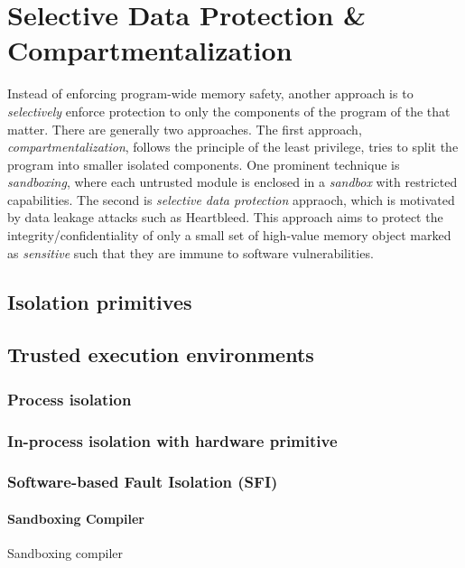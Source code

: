 \documentclass[11pt]{memoir}
\begin{document}
\section{Selective Data Protection \& Compartmentalization}
Instead of enforcing program-wide memory safety, another approach is to \emph{selectively} enforce protection to only the components of the program of the that matter.
There are generally two approaches.
The first approach, \emph{compartmentalization}, follows the principle of the least privilege, tries to split the program into smaller isolated components.
One prominent technique is \emph{sandboxing}, where each untrusted module is enclosed in a \emph{sandbox} with restricted capabilities.
The second is \emph{selective data protection} appraoch, which is motivated by data leakage attacks such as Heartbleed.
This approach aims to protect the integrity/confidentiality of only a small set of high-value memory object marked as \emph{sensitive} such that they are immune to software vulnerabilities. 




\subsection{Isolation primitives}
\subsection{Trusted execution environments}

\subsubsection{Process isolation}

\subsubsection{In-process isolation with hardware primitive}

\subsubsection{Software-based Fault Isolation (SFI)}

\paragraph{Sandboxing Compiler}
Sandboxing compiler 
\end{document}
